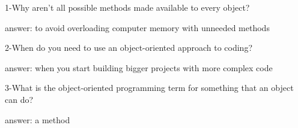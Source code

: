 1-Why aren't all possible methods made available to every object?


answer: to avoid overloading computer memory with unneeded methods

2-When do you need to use an object-oriented approach to coding?


answer: when you start building bigger projects with more complex code

3-What is the object-oriented programming term for something that an object can do?


answer: a method

